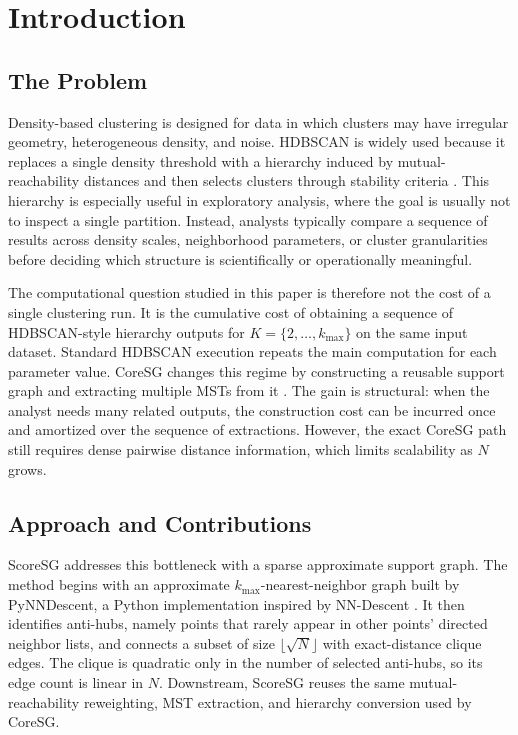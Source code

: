 \documentclass[11pt]{article}
\begin{document}
\section{Introduction}

\subsection{The Problem}

Density-based clustering is designed for data in which clusters may have irregular geometry, heterogeneous density, and noise. HDBSCAN is widely used because it replaces a single density threshold with a hierarchy induced by mutual-reachability distances and then selects clusters through stability criteria \citep{campello2013density,campello2015hierarchical}. This hierarchy is especially useful in exploratory analysis, where the goal is usually not to inspect a single partition. Instead, analysts typically compare a sequence of results across density scales, neighborhood parameters, or cluster granularities before deciding which structure is scientifically or operationally meaningful.

The computational question studied in this paper is therefore not the cost of a single clustering run. It is the cumulative cost of obtaining a sequence of HDBSCAN-style hierarchy outputs for \(K=\{2,\ldots,k_{\max}\}\) on the same input dataset. Standard HDBSCAN execution repeats the main computation for each parameter value. CoreSG changes this regime by constructing a reusable support graph and extracting multiple MSTs from it \citep{araujo2022coresg}. The gain is structural: when the analyst needs many related outputs, the construction cost can be incurred once and amortized over the sequence of extractions. However, the exact CoreSG path still requires dense pairwise distance information, which limits scalability as \(N\) grows.

\subsection{Approach and Contributions}

ScoreSG addresses this bottleneck with a sparse approximate support graph. The method begins with an approximate \(k_{\max}\)-nearest-neighbor graph built by PyNNDescent, a Python implementation inspired by NN-Descent \citep{dong2011efficient,pynndescentdocs}. It then identifies anti-hubs, namely points that rarely appear in other points' directed neighbor lists, and connects a subset of size \(\lfloor\sqrt{N}\rfloor\) with exact-distance clique edges. The clique is quadratic only in the number of selected anti-hubs, so its edge count is linear in \(N\). Downstream, ScoreSG reuses the same mutual-reachability reweighting, MST extraction, and hierarchy conversion used by CoreSG.
\end{document}
